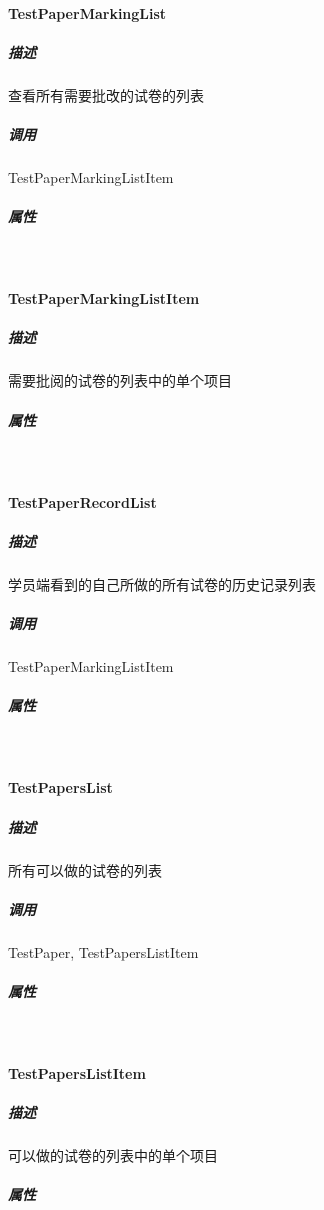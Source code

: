 \documentclass{article}
\begin{document}
        \paragraph{TestPaperMarkingList}
            \subparagraph{描述}
                查看所有需要批改的试卷的列表
            \subparagraph{调用}
                TestPaperMarkingListItem
            \subparagraph{属性}\ \par
                
        \paragraph{TestPaperMarkingListItem}
            \subparagraph{描述}
                需要批阅的试卷的列表中的单个项目
            \subparagraph{属性}\ \par
                
        \paragraph{TestPaperRecordList}
            \subparagraph{描述}
                学员端看到的自己所做的所有试卷的历史记录列表
            \subparagraph{调用}
                TestPaperMarkingListItem
            \subparagraph{属性}\ \par
                
        \paragraph{TestPapersList}
            \subparagraph{描述}
                所有可以做的试卷的列表
            \subparagraph{调用}
                TestPaper, TestPapersListItem
            \subparagraph{属性}\ \par
                
        \paragraph{TestPapersListItem}
            \subparagraph{描述}
                可以做的试卷的列表中的单个项目
            \subparagraph{属性}\ \par
            
\end{document}
